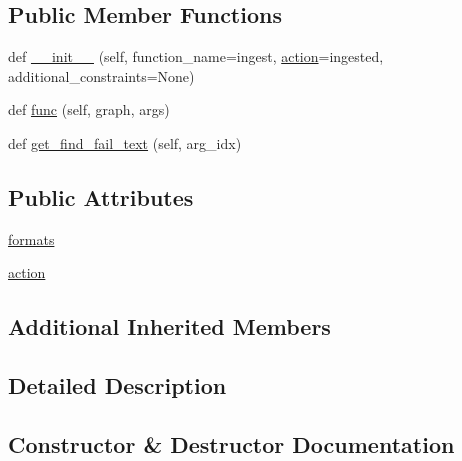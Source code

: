 \subsection*{Public Member Functions}
\begin{DoxyCompactItemize}
\item 
def \hyperlink{classlight__chats_1_1graph_1_1IngestFunction_ad4e544e64b77af820462e71260a067d5}{\+\_\+\+\_\+init\+\_\+\+\_\+} (self, function\+\_\+name=\textquotesingle{}ingest\textquotesingle{}, \hyperlink{classlight__chats_1_1graph_1_1IngestFunction_a622f30ce7ef9f3c210c1881eab7c2744}{action}=\textquotesingle{}ingested\textquotesingle{}, additional\+\_\+constraints=None)
\item 
def \hyperlink{classlight__chats_1_1graph_1_1IngestFunction_acf3afc20e4e55a9bd2783d2bad592a88}{func} (self, graph, args)
\item 
def \hyperlink{classlight__chats_1_1graph_1_1IngestFunction_aae6cb9fc171d5a59c3d2bafae9ed58b7}{get\+\_\+find\+\_\+fail\+\_\+text} (self, arg\+\_\+idx)
\end{DoxyCompactItemize}
\subsection*{Public Attributes}
\begin{DoxyCompactItemize}
\item 
\hyperlink{classlight__chats_1_1graph_1_1IngestFunction_af639522820335d377bf31825afe21584}{formats}
\item 
\hyperlink{classlight__chats_1_1graph_1_1IngestFunction_a622f30ce7ef9f3c210c1881eab7c2744}{action}
\end{DoxyCompactItemize}
\subsection*{Additional Inherited Members}


\subsection{Detailed Description}
\begin{DoxyVerb}
\end{DoxyVerb}
 

\subsection{Constructor \& Destructor Documentation}
\mbox{\label{classlight__chats_1_1graph_1_1IngestFunction_ad4e544e64b77af820462e71260a067d5}} 
